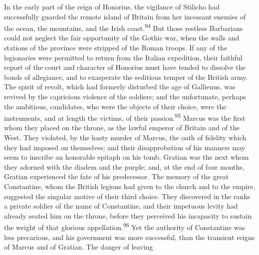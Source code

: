 

In the early part of the reign of Honorius, the vigilance of
Stilicho had successfully guarded the remote island of Britain
from her incessant enemies of the ocean, the mountains, and the
Irish coast.\textsuperscript{94} But those restless Barbarians could not neglect
the fair opportunity of the Gothic war, when the walls and
stations of the province were stripped of the Roman troops. If
any of the legionaries were permitted to return from the Italian
expedition, their faithful report of the court and character of
Honorius must have tended to dissolve the bonds of allegiance,
and to exasperate the seditious temper of the British army. The
spirit of revolt, which had formerly disturbed the age of
Gallienus, was revived by the capricious violence of the
soldiers; and the unfortunate, perhaps the ambitious, candidates,
who were the objects of their choice, were the instruments, and
at length the victims, of their passion.\textsuperscript{95} Marcus was the first
whom they placed on the throne, as the lawful emperor of Britain
and of the West. They violated, by the hasty murder of Marcus,
the oath of fidelity which they had imposed on themselves; and
their disapprobation of his manners may seem to inscribe an
honorable epitaph on his tomb. Gratian was the next whom they
adorned with the diadem and the purple; and, at the end of four
months, Gratian experienced the fate of his predecessor. The
memory of the great Constantine, whom the British legions had
given to the church and to the empire, suggested the singular
motive of their third choice. They discovered in the ranks a
private soldier of the name of Constantine, and their impetuous
levity had already seated him on the throne, before they
perceived his incapacity to sustain the weight of that glorious
appellation.\textsuperscript{96} Yet the authority of Constantine was less
precarious, and his government was more successful, than the
transient reigns of Marcus and of Gratian. The danger of leaving
